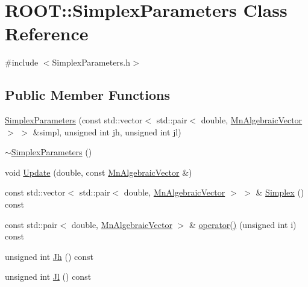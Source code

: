 \hypertarget{classROOT_1_1Minuit2_1_1SimplexParameters}{}\section{R\+O\+OT\+:\+:Simplex\+Parameters Class Reference}
\label{classROOT_1_1Minuit2_1_1SimplexParameters}


{\ttfamily \#include $<$Simplex\+Parameters.\+h$>$}

\subsection*{Public Member Functions}
\begin{DoxyCompactItemize}
\item 
\mbox{\hyperlink{classROOT_1_1Minuit2_1_1SimplexParameters_a65e9ef329f7c1be19f68e0a1b817c584}{Simplex\+Parameters}} (const std\+::vector$<$ std\+::pair$<$ double, \mbox{\hyperlink{namespaceROOT_1_1Minuit2_a62ed97730a1ca8d3fbaec64a19aa11c9}{Mn\+Algebraic\+Vector}} $>$ $>$ \&simpl, unsigned int jh, unsigned int jl)
\item 
\mbox{\hyperlink{classROOT_1_1Minuit2_1_1SimplexParameters_a13162b4c95b96890972dc24e7ba2e9a8}{$\sim$\+Simplex\+Parameters}} ()
\item 
void \mbox{\hyperlink{classROOT_1_1Minuit2_1_1SimplexParameters_aa9536cc9c7754ce308160d5e456ac54f}{Update}} (double, const \mbox{\hyperlink{namespaceROOT_1_1Minuit2_a62ed97730a1ca8d3fbaec64a19aa11c9}{Mn\+Algebraic\+Vector}} \&)
\item 
const std\+::vector$<$ std\+::pair$<$ double, \mbox{\hyperlink{namespaceROOT_1_1Minuit2_a62ed97730a1ca8d3fbaec64a19aa11c9}{Mn\+Algebraic\+Vector}} $>$ $>$ \& \mbox{\hyperlink{classROOT_1_1Minuit2_1_1SimplexParameters_a873b8883c6932b879348e73d36d86afb}{Simplex}} () const
\item 
const std\+::pair$<$ double, \mbox{\hyperlink{namespaceROOT_1_1Minuit2_a62ed97730a1ca8d3fbaec64a19aa11c9}{Mn\+Algebraic\+Vector}} $>$ \& \mbox{\hyperlink{classROOT_1_1Minuit2_1_1SimplexParameters_aa05f3fb5da27277879fad702d85bae49}{operator()}} (unsigned int i) const
\item 
unsigned int \mbox{\hyperlink{classROOT_1_1Minuit2_1_1SimplexParameters_a54250c0d286fcf4d6bbb45df037c7d85}{Jh}} () const
\item 
unsigned int \mbox{\hyperlink{classROOT_1_1Minuit2_1_1SimplexParameters_accfb7ec2b1087661ed3c31dfbb473413}{Jl}} () const

\end{DoxyCompactItemize}
